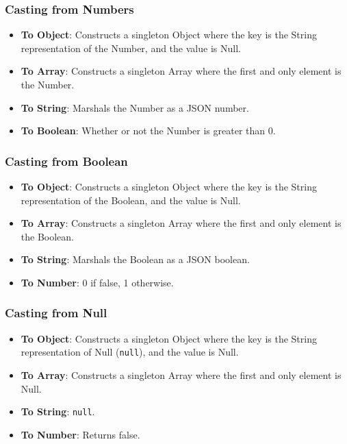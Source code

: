 \documentclass[]{full}
\theoremstyle{definition}
\begin{document}
\subsubsection{Casting from Numbers}

\begin{itemize}
    \item \textbf{To Object}: Constructs a singleton Object where the key is the String representation of the Number, and the value is Null.
    \item \textbf{To Array}: Constructs a singleton Array where the first and only element is the Number.
    \item \textbf{To String}: Marshals the Number as a JSON number.
    \item \textbf{To Boolean}: Whether or not the Number is greater than 0.
\end{itemize}

\subsubsection{Casting from Boolean}

\begin{itemize}
    \item \textbf{To Object}: Constructs a singleton Object where the key is the String representation of the Boolean, and the value is Null.
    \item \textbf{To Array}: Constructs a singleton Array where the first and only element is the Boolean.
    \item \textbf{To String}: Marshals the Boolean as a JSON boolean.
    \item \textbf{To Number}: 0 if false, 1 otherwise.
\end{itemize}

\subsubsection{Casting from Null}

\begin{itemize}
    \item \textbf{To Object}: Constructs a singleton Object where the key is the String representation of Null (\verb|null|), and the value is Null.
    \item \textbf{To Array}: Constructs a singleton Array where the first and only element is Null.
    \item \textbf{To String}: \verb|null|.
    \item \textbf{To Number}: Returns false.
\end{itemize}
\end{document}
